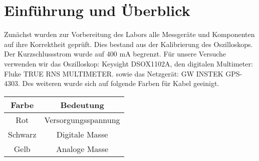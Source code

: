 \chapter{Einführung und Überblick}
Zunächst wurden zur Vorbereitung des Labors alle Messgeräte und Komponenten auf ihre Korrektheit geprüft.
Dies bestand aus der Kalibrierung des Oszilloskops. 
Der Kurzschlussstrom wurde auf 400 mA begrenzt.\newline
Für unsere Versuche verwenden wir das Oszilloskop: Keysight DSOX1102A, \newline
den digitalen Multimeter: Fluke TRUE RNS MULTIMETER.\newline
sowie das Netzgerät: GW INSTEK GPS-4303.\newline \newline
Des weiteren wurde sich auf folgende Farben für Kabel geeinigt.

\begin{tabular}[h]{c|c}
    Farbe & Bedeutung\\
    \hline
    Rot & Versorgungsspannung \\
    \hline
    Schwarz & Digitale Masse \\
    \hline
    Gelb & Analoge Masse 
        \label{tab:Farbenzuordnung}
   \end{tabular}

